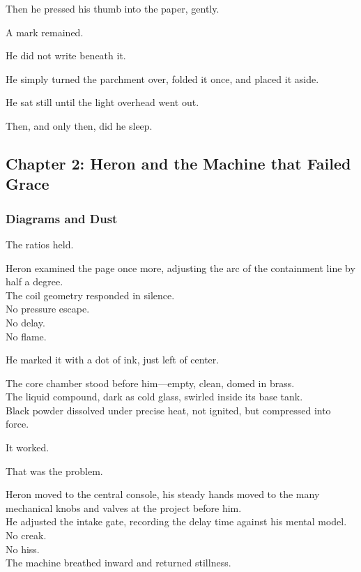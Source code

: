 \documentclass[12pt]{article}
\begin{document}
Then he pressed his thumb into the paper, gently.

A mark remained.

\vspace{1em}

He did not write beneath it.

He simply turned the parchment over, folded it once, and placed it aside.

He sat still until the light overhead went out.

Then, and only then, did he sleep.

\newpage

\subsection*{Chapter 2: Heron and the Machine that Failed Grace}

\vspace{.5in}

\subsubsection*{Diagrams and Dust}

The ratios held.

Heron examined the page once more, adjusting the arc of the containment line by half a degree.\\
The coil geometry responded in silence.\\
No pressure escape.\\
No delay.\\
No flame.

He marked it with a dot of ink, just left of center.

The core chamber stood before him—empty, clean, domed in brass.\\
The liquid compound, dark as cold glass, swirled inside its base tank.\\
Black powder dissolved under precise heat, not ignited, but compressed into force.

It worked.

That was the problem.

\vspace{1em}

Heron moved to the central console, his steady hands moved to the many mechanical knobs and valves at the project before him.\\
He adjusted the intake gate, recording the delay time against his mental model.\\
No creak.\\
No hiss.\\
The machine breathed inward and returned stillness.
\end{document}

